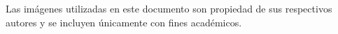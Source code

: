 \documentclass[letterpaper,12pt]{article}
\begin{document}
	
	
	
	\tableofcontents
	\newpage
	
	
	
	\newpage
	\nocite{*}
	
	
	
	\centering\small
	\bigskip
	Las imágenes utilizadas en este documento son propiedad de sus respectivos autores y se incluyen únicamente con fines académicos.
	
\end{document}
